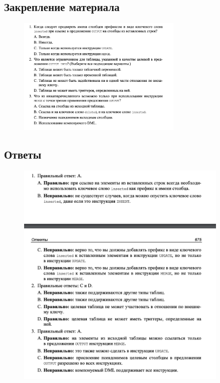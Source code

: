 \subsection*{Закрепление материала}

\begin{figure}[h!]
	\begin{center}
		\includegraphics[width=0.7\textwidth]{img/zakrep26.png}
	\end{center}
	\captionsetup{justification=centering}
\end{figure}
\clearpage

\subsection*{Ответы}

\begin{figure}[h!]
	\begin{center}
		\includegraphics[width=0.9\textwidth]{img/ans26.png}
	\end{center}
	\captionsetup{justification=centering}
\end{figure}


